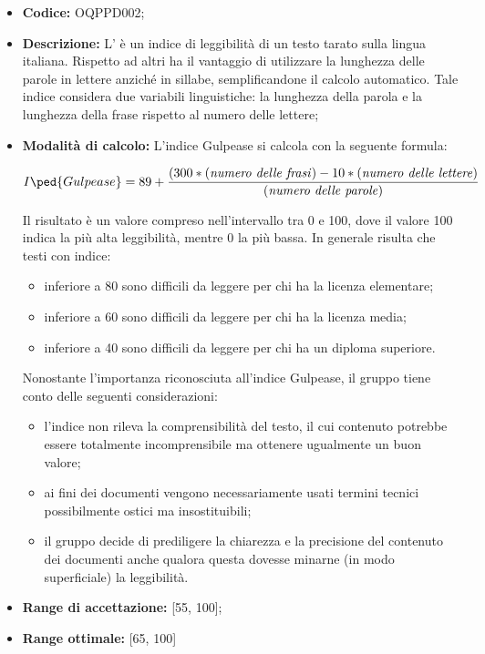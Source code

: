 \documentclass[openany,12pt,a4paper]{report}
\begin{document}
\begin{itemize}
    \item \textbf{Codice:} OQPPD002;

    \item \textbf{Descrizione:} L’ è un indice di leggibilità di un testo tarato sulla lingua italiana. Rispetto ad altri ha il vantaggio di utilizzare la lunghezza delle parole in lettere anziché in sillabe, semplificandone il calcolo automatico. Tale indice considera due variabili linguistiche: la lunghezza della parola e la lunghezza della frase rispetto al numero delle lettere;
    
    \item \textbf{Modalità di calcolo:} L'indice Gulpease si calcola con la seguente formula:

    \[ I\ped{Gulpease} = 89 +  \frac{(300*(\textrm{\textit{numero delle frasi}})-10*(\textrm{\textit{numero delle lettere}})}{(\textrm{\textit{numero delle parole}})} \]
    
    Il risultato è un valore compreso nell’intervallo tra 0 e 100, dove il valore 100 indica la
    più alta leggibilità, mentre 0 la più bassa. In generale risulta che testi con indice:
        \begin{itemize}
            \item inferiore a 80 sono difficili da leggere per chi ha la licenza elementare; 
            \item inferiore a 60 sono difficili da leggere per chi ha la licenza media;
            \item inferiore a 40 sono difficili da leggere per chi ha un diploma superiore.
        \end{itemize}
            
    Nonostante l'importanza riconosciuta all'indice Gulpease, il gruppo tiene conto delle seguenti considerazioni:
    \begin{itemize}
        \item l'indice non rileva la comprensibilità del testo, il cui contenuto potrebbe essere totalmente incomprensibile ma ottenere ugualmente un buon valore; 
        \item ai fini dei documenti vengono necessariamente usati termini tecnici possibilmente ostici ma insostituibili;
        \item il gruppo decide di prediligere la chiarezza e la precisione del contenuto dei documenti anche qualora questa dovesse minarne (in modo superficiale) la leggibilità.
    \end{itemize}
    
    \item \textbf{Range di accettazione:} [55, 100];
    \item \textbf{Range ottimale:} [65, 100]
\end{itemize}
\end{document}
